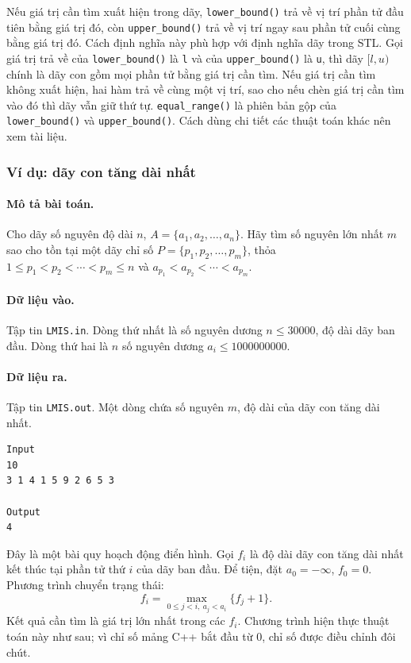 \documentclass[11pt]{article}
\newcommand{\cpp}{C++}
\begin{document}
Nếu giá trị cần tìm xuất hiện trong dãy, \verb|lower_bound()| trả về vị trí
phần tử đầu tiên bằng giá trị đó, còn \verb|upper_bound()| trả về vị trí ngay
sau phần tử cuối cùng bằng giá trị đó. Cách định nghĩa này phù hợp với định
nghĩa dãy trong STL. Gọi giá trị trả về của \verb|lower_bound()| là \verb|l|
và của \verb|upper_bound()| là \verb|u|, thì dãy \([l,u)\) chính là dãy con
gồm mọi phần tử bằng giá trị cần tìm. Nếu giá trị cần tìm không xuất hiện,
hai hàm trả về cùng một vị trí, sao cho nếu chèn giá trị cần tìm vào đó thì
dãy vẫn giữ thứ tự. \verb|equal_range()| là phiên bản gộp của
\verb|lower_bound()| và \verb|upper_bound()|. Cách dùng chi tiết các thuật
toán khác nên xem tài liệu.

\subsubsection*{Ví dụ: dãy con tăng dài nhất}

\paragraph{Mô tả bài toán.}
Cho dãy số nguyên độ dài \(n\),
\(A=\{a_1,a_2,\ldots,a_n\}\). Hãy tìm số nguyên lớn nhất \(m\) sao cho tồn
tại một dãy chỉ số \(P=\{p_1,p_2,\ldots,p_m\}\), thỏa
\(1\le p_1<p_2<\cdots<p_m\le n\) và
\(a_{p_1}<a_{p_2}<\cdots<a_{p_m}\).

\paragraph{Dữ liệu vào.}
Tập tin \verb|LMIS.in|. Dòng thứ nhất là số nguyên dương \(n\le 30000\), độ
dài dãy ban đầu. Dòng thứ hai là \(n\) số nguyên dương \(a_i\le 1000000000\).

\paragraph{Dữ liệu ra.}
Tập tin \verb|LMIS.out|. Một dòng chứa số nguyên \(m\), độ dài của dãy con
tăng dài nhất.

\begin{verbatim}
Input
10
3 1 4 1 5 9 2 6 5 3

Output
4
\end{verbatim}

Đây là một bài quy hoạch động điển hình. Gọi \(f_i\) là độ dài dãy con tăng
dài nhất kết thúc tại phần tử thứ \(i\) của dãy ban đầu. Để tiện, đặt
\(a_0=-\infty\), \(f_0=0\). Phương trình chuyển trạng thái:
\[
f_i=\max_{0\le j<i,\ a_j<a_i}\{f_j+1\}.
\]
Kết quả cần tìm là giá trị lớn nhất trong các \(f_i\). Chương trình hiện thực
thuật toán này như sau; vì chỉ số mảng \cpp{} bắt đầu từ \(0\), chỉ số được
điều chỉnh đôi chút.
\end{document}
